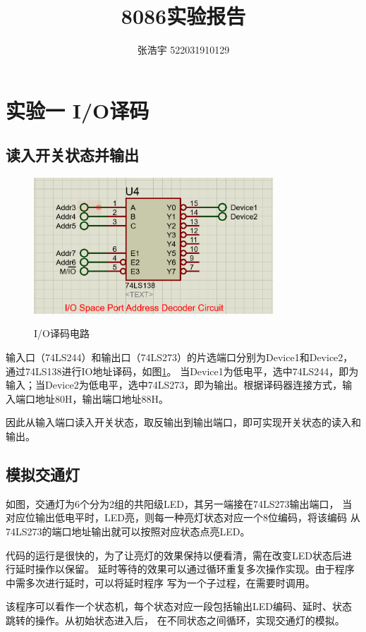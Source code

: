 \documentclass[12pt, a4paper, oneside]{ctexart}
\title{\textbf{8086实验报告}}
\author{张浩宇 522031910129}
\date{}
\begin{document}
    \maketitle
    \section{实验一 I/O译码}
    \subsection{读入开关状态并输出}
    \begin{figure}[!h]
        \centering
        \includegraphics[width=0.8\textwidth]{img/fig1-183decoder.png}
        \label{fig:decoder}
        \caption{I/O译码电路}
    \end{figure} 
    输入口（74LS244）和输出口（74LS273）的片选端口分别为Device1和Device2，通过74LS138进行IO地址译码，如图{\ref{fig:decoder}}。
    当Device1为低电平，选中74LS244，即为输入；当Device2为低电平，选中74LS273，即为输出。根据译码器连接方式，输入端口地址80H，输出端口地址88H。
    
    因此从输入端口读入开关状态，取反输出到输出端口，即可实现开关状态的读入和输出。
    \subsection{模拟交通灯}
    如图，交通灯为6个分为2组的共阳级LED，其另一端接在74LS273输出端口，
    当对应位输出低电平时，LED亮，则每一种亮灯状态对应一个8位编码，将该编码
    从74LS273的端口地址输出就可以按照对应状态点亮LED。

    代码的运行是很快的，为了让亮灯的效果保持以便看清，需在改变LED状态后进行延时操作以保留。
    延时等待的效果可以通过循环重复多次操作实现。由于程序中需多次进行延时，可以将延时程序
    写为一个子过程，在需要时调用。

    该程序可以看作一个状态机，每个状态对应一段包括输出LED编码、延时、状态跳转的操作。从初始状态进入后，
    在不同状态之间循环，实现交通灯的模拟。
\end{document}

